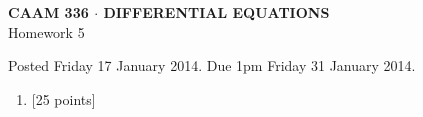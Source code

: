 \documentclass[10pt]{article}
\begin{document}
\vspace*{-5em}
\begin{center}
\large \textsf{\textbf{CAAM 336 $\cdot$ DIFFERENTIAL EQUATIONS}\\[0.5em]
Homework 5 }
\end{center}

Posted Friday 17 January 2014.  Due 1pm Friday 31 January 2014.

\begin{enumerate}\addtocounter{enumi}{4}
\item {[25 points]}\\  

\end{enumerate}
\end{document}
